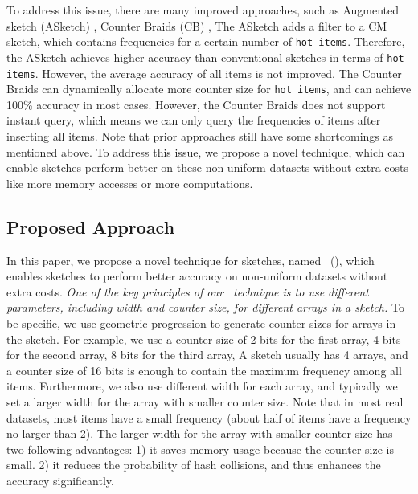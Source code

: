 To address this issue, there are many improved approaches, such as Augmented sketch (ASketch) \cite{roy2016augmented}, Counter Braids (CB) \cite{lu2008counter}, \etc
The ASketch adds a filter to a CM sketch, which contains frequencies for a certain number of \texttt{hot items}.
Therefore, the ASketch achieves higher accuracy than conventional sketches in terms of \texttt{hot items}.
However, the average accuracy of all items is not improved.
The Counter Braids can dynamically allocate more counter size for \texttt{hot items}, and can achieve 100\% accuracy in most cases.
However, the Counter Braids does not support instant query, which means we can only query the frequencies of items after inserting all items.
Note that prior approaches still have some shortcomings as mentioned above.
To address this issue, we propose a novel technique, which can enable sketches perform better on these non-uniform datasets without extra costs like more memory accesses or more computations.

\presub
\subsection{Proposed Approach} \postsub

In this paper, we propose a novel technique for sketches, named \fname~(\aname), which enables sketches to perform better accuracy on non-uniform datasets without extra costs.
\textit{One of the key principles of our \aname~technique is to use different parameters, including width and counter size, for different arrays in a sketch.}
To be specific, we use geometric progression to generate counter sizes for arrays in the sketch.
For example, we use a counter size of 2 bits for the first array, 4 bits for the second array, 8 bits for the third array, \etc
A sketch usually has 4 arrays, and a counter size of 16 bits is enough to contain the maximum frequency among all items.
Furthermore, we also use different width for each array, and typically we set a larger width for the array with smaller counter size.
Note that in most real datasets, most items have a small frequency (about half of items have a frequency no larger than 2).
The larger width for the array with smaller counter size has two following advantages: 1) it saves memory usage because the counter size is small. 2) it reduces the probability of hash collisions, and thus enhances the accuracy significantly.

